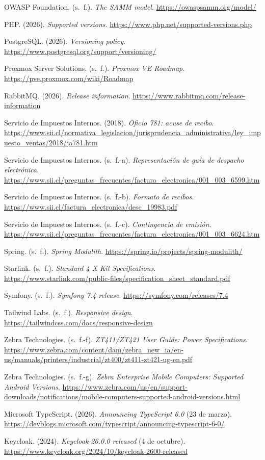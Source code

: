 \begin{list}{}{\setlength{\leftmargin}{1.27cm}\setlength{\itemindent}{-1.27cm}\setlength{\itemsep}{0.5\baselineskip}\raggedright}
\item OWASP Foundation. (s.~f.). \textit{The SAMM model}. \url{https://owaspsamm.org/model/}
\item PHP. (2026). \textit{Supported versions}. \url{https://www.php.net/supported-versions.php}
\item PostgreSQL. (2026). \textit{Versioning policy}. \url{https://www.postgresql.org/support/versioning/}
\item Proxmox Server Solutions. (s.~f.). \textit{Proxmox VE Roadmap}. \url{https://pve.proxmox.com/wiki/Roadmap}
\item RabbitMQ. (2026). \textit{Release information}. \url{https://www.rabbitmq.com/release-information}
\item Servicio de Impuestos Internos. (2018). \textit{Oficio 781: acuse de recibo}. \url{https://www.sii.cl/normativa_legislacion/jurisprudencia_administrativa/ley_impuesto_ventas/2018/ja781.htm}
\item Servicio de Impuestos Internos. (s.~f.-a). \textit{Representación de guía de despacho electrónica}. \url{https://www.sii.cl/preguntas_frecuentes/factura_electronica/001_003_6599.htm}
\item Servicio de Impuestos Internos. (s.~f.-b). \textit{Formato de recibos}. \url{https://www.sii.cl/factura_electronica/desc_19983.pdf}
\item Servicio de Impuestos Internos. (s.~f.-c). \textit{Contingencia de emisión}. \url{https://www.sii.cl/preguntas_frecuentes/factura_electronica/001_003_6624.htm}
\item Spring. (s.~f.). \textit{Spring Modulith}. \url{https://spring.io/projects/spring-modulith/}
\item Starlink. (s.~f.). \textit{Standard 4 X Kit Specifications}. \url{https://www.starlink.com/public-files/specification_sheet_standard.pdf}
\item Symfony. (s.~f.). \textit{Symfony 7.4 release}. \url{https://symfony.com/releases/7.4}
\item Tailwind Labs. (s.~f.). \textit{Responsive design}. \url{https://tailwindcss.com/docs/responsive-design}
\item Zebra Technologies. (s.~f.-f). \textit{ZT411/ZT421 User Guide: Power Specifications}. \url{https://www.zebra.com/content/dam/zebra_new_ia/en-us/manuals/printers/industrial/zt400/zt411-zt421-ug-en.pdf}
\item Zebra Technologies. (s.~f.-g). \textit{Zebra Enterprise Mobile Computers: Supported Android Versions}. \url{https://www.zebra.com/us/en/support-downloads/notifications/mobile-computers-supported-android-versions.html}
\item Microsoft TypeScript. (2026). \textit{Announcing TypeScript 6.0} (23 de marzo). \url{https://devblogs.microsoft.com/typescript/announcing-typescript-6-0/}
\item Keycloak. (2024). \textit{Keycloak 26.0.0 released} (4 de octubre). \url{https://www.keycloak.org/2024/10/keycloak-2600-released}
\end{list}

\clearpage